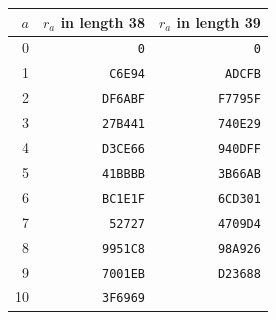 \begin{tabular}{rrr}
\toprule
$a$ & $r_a$ in length 38 & $r_a$ in length 39\\
\midrule
0 & \texttt{0} & \texttt{0}\\
1 & \texttt{C6E94} & \texttt{ADCFB}\\
2 & \texttt{DF6ABF} & \texttt{F7795F}\\
3 & \texttt{27B441} & \texttt{740E29}\\
4 & \texttt{D3CE66} & \texttt{940DFF}\\
5 & \texttt{41BBBB} & \texttt{3B66AB}\\
6 & \texttt{BC1E1F} & \texttt{6CD301}\\
7 & \texttt{52727} & \texttt{4709D4}\\
8 & \texttt{9951C8} & \texttt{98A926}\\
9 & \texttt{7001EB} & \texttt{D23688}\\
10 & \texttt{3F6969} & \\
\bottomrule
\end{tabular}

